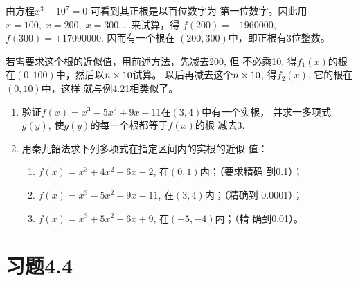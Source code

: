 \begin{solution}
由方程$x^3-10^7=0$ 可看到其正根是以百位数字为
第一位数字。因此用$x=100,\; x=200,\; x=300,\ldots$来试算，得
$f(200)=-1960000$, $f(300)=+17090000$. 因而有一个根在
$(200,300)$中，即正根有3位整数。

若需要求这个根的近似值，用前述方法，先减去200, 但
不必乘10, 得$f_1(x)$的根在$(0,100)$中，然后以$n\times10$试算。
以后再减去这个$n\times10$, 得$f_2(x)$, 它的根在$(0,10)$中，这样
就与例4.21相类似了。
\end{solution}

\begin{ex}
\begin{enumerate}
    \item 验证$f(x)=x^3-5x^2+9x-11$在$(3,4)$中有一个实根，
    并求一多项式$g(y)$, 使$g(y)$的每一个根都等于$f(x)$的根
    减去3.
    \item 用秦九韶法求下列多项式在指定区间内的实根的近似
    值：
    \begin{enumerate}
    \item $f(x)=x^3+4x^2+6x-2$, 在$(0,1)$内；（要求精确
    到0.1）；
    \item $f(x)=x^3-5x^2+9x-11$, 在$(3,4)$内；（精确到
    0.0001）；
    \item $f(x)=x^3+5x^2+6x+9$, 在$(-5,-4)$内；（精
    确到0.01）。        
    \end{enumerate}
\end{enumerate}
\end{ex}

\section*{习题4.4}



